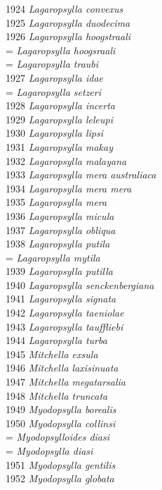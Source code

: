 \documentclass[
]{article}
\begin{document}
1924 \emph{Lagaropsylla convexus}\\
1925 \emph{Lagaropsylla duodecima}\\
1926 \emph{Lagaropsylla hoogstraali}\\
= \emph{Lagaropsylla hoogsraali}\\
= \emph{Lagaropsylla traubi}\\
1927 \emph{Lagaropsylla idae}\\
= \emph{Lagaropsylla setzeri}\\
1928 \emph{Lagaropsylla incerta}\\
1929 \emph{Lagaropsylla leleupi}\\
1930 \emph{Lagaropsylla lipsi}\\
1931 \emph{Lagaropsylla makay}\\
1932 \emph{Lagaropsylla malayana}\\
1933 \emph{Lagaropsylla mera australiaca}\\
1934 \emph{Lagaropsylla mera mera}\\
1935 \emph{Lagaropsylla mera}\\
1936 \emph{Lagaropsylla micula}\\
1937 \emph{Lagaropsylla obliqua}\\
1938 \emph{Lagaropsylla putila}\\
= \emph{Lagaropsylla mytila}\\
1939 \emph{Lagaropsylla putilla}\\
1940 \emph{Lagaropsylla senckenbergiana}\\
1941 \emph{Lagaropsylla signata}\\
1942 \emph{Lagaropsylla taeniolae}\\
1943 \emph{Lagaropsylla tauffliebi}\\
1944 \emph{Lagaropsylla turba}\\
1945 \emph{Mitchella exsula}\\
1946 \emph{Mitchella laxisinuata}\\
1947 \emph{Mitchella megatarsalia}\\
1948 \emph{Mitchella truncata}\\
1949 \emph{Myodopsylla borealis}\\
1950 \emph{Myodopsylla collinsi}\\
= \emph{Myodopsylloides diasi}\\
= \emph{Myodopsylla diasi}\\
1951 \emph{Myodopsylla gentilis}\\
1952 \emph{Myodopsylla globata}\\
\end{document}
